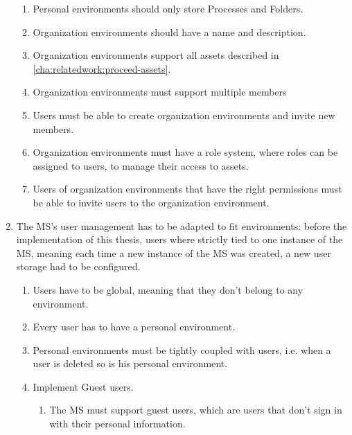 \begin{enumerate}
\begin{enumerate}
		      \item Personal environments should only store Processes and Folders.

		      \item Organization environments should have a name and description.

		      \item Organization environments support all assets described in \ref{cha:relatedwork:proceed-assets}.

		      \item Organization environments must support multiple members

		      \item Users must be able to create organization environments and invite new
		            members.

		      \item Organization environments must have a role system, where roles can be assigned to
		            users, to manage their access to assets.

		      \item Users of organization environments that have the right permissions must be able to invite users
		            to the organization environment.
	      \end{enumerate}


	\item The MS's user management has to be adapted to fit environments: before the
	      implementation of this thesis, users where strictly tied to one instance of the MS,
	      meaning each time a new instance of the MS was created, a new user storage had to be
	      configured.
	      \begin{enumerate}
		      \item Users have to be global, meaning that they don't belong to any environment.

		      \item Every user has to have a personal environment.

		      \item Personal environments must be tightly coupled with users, i.e. when a user is
		            deleted so is his personal environment.

		      \item Implement Guest users.
		            \begin{enumerate}
			            \item The MS must support guest users, which are users that don't sign in with their personal
			                  information.


\end{enumerate}
\end{enumerate}
\end{enumerate}

